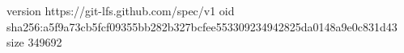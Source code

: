 version https://git-lfs.github.com/spec/v1
oid sha256:a5f9a73cb5fcf09355bb282b327bcfee553309234942825da0148a9e0c831d43
size 349692
